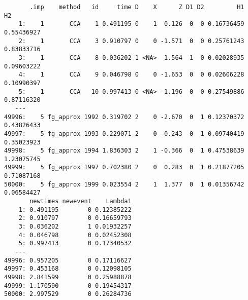 \documentclass[
  12pt,
  a4paper,
]{article}
\newenvironment{Shaded}{\begin{snugshade}}{\end{snugshade}}
\newcommand{\AttributeTok}[1]{\textcolor[rgb]{0.40,0.45,0.13}{#1}}
\newcommand{\CommentTok}[1]{\textcolor[rgb]{0.37,0.37,0.37}{#1}}
\newcommand{\ControlFlowTok}[1]{\textcolor[rgb]{0.00,0.23,0.31}{#1}}
\newcommand{\FunctionTok}[1]{\textcolor[rgb]{0.28,0.35,0.67}{#1}}
\newcommand{\NormalTok}[1]{\textcolor[rgb]{0.00,0.23,0.31}{#1}}
\newcommand{\OtherTok}[1]{\textcolor[rgb]{0.00,0.23,0.31}{#1}}
\newcommand{\SpecialCharTok}[1]{\textcolor[rgb]{0.37,0.37,0.37}{#1}}
\newcommand{\StringTok}[1]{\textcolor[rgb]{0.13,0.47,0.30}{#1}}
\begin{document}
\begin{verbatim}
       .imp    method   id     time D    X      Z D1 D2         H1         H2
    1:    1       CCA    1 0.491195 0    1  0.126  0  0 0.16736459 0.55436927
    2:    1       CCA    3 0.910797 0    0 -1.571  0  0 0.25761243 0.83833716
    3:    1       CCA    8 0.036202 1 <NA>  1.564  1  0 0.02028935 0.09603222
    4:    1       CCA    9 0.046798 0    0 -1.653  0  0 0.02606228 0.10990397
    5:    1       CCA   10 0.997413 0 <NA> -1.196  0  0 0.27549886 0.87116320
   ---                                                                       
49996:    5 fg_approx 1992 0.319702 2    0 -2.670  0  1 0.12370372 0.43826433
49997:    5 fg_approx 1993 0.229071 2    0 -0.243  0  1 0.09740419 0.35023923
49998:    5 fg_approx 1994 1.836303 2    1 -0.366  0  1 0.47538639 1.23075745
49999:    5 fg_approx 1997 0.702380 2    0  0.283  0  1 0.21877205 0.71087168
50000:    5 fg_approx 1999 0.023554 2    1  1.377  0  1 0.01356742 0.06584427
       newtimes newevent    Lambda1
    1: 0.491195        0 0.12385222
    2: 0.910797        0 0.16659793
    3: 0.036202        1 0.01932257
    4: 0.046798        0 0.02452308
    5: 0.997413        0 0.17340532
   ---                             
49996: 0.957205        0 0.17116627
49997: 0.453168        0 0.12098105
49998: 2.841599        0 0.25988878
49999: 1.170590        0 0.19454317
50000: 2.997529        0 0.26284736
\end{verbatim}

\begin{Shaded}
\end{Shaded}
\end{document}
